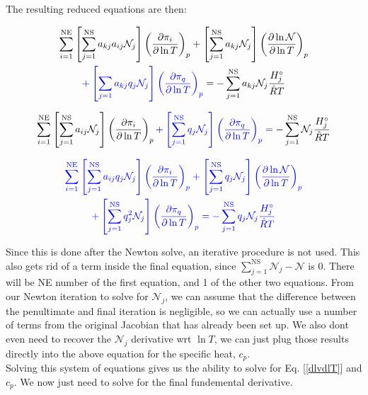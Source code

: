 \documentclass[10pt]{article}
\begin{document}
\begin{flushleft}
The resulting reduced equations are then:

\begin{multline}
    \sum_{i=1}^\text{NE} \left[ \sum_{j=1}^\text{NS} a_{kj} a_{ij} \mathcal{N}_j \right] \left( \frac{\partial \pi_i}{\partial \ln T} \right)_p + \left[\sum_{j=1}^\text{NS} a_{kj} \mathcal{N}_j \right] \left( \frac{\partial \ln \mathcal{N}}{\partial \ln T} \right)_p \\ \textcolor{blue}{+ \left[ \sum_{j=1} a_{kj} q_j \mathcal{N}_j \right] \left( \frac{\partial \pi_q}{\partial \ln T} \right)_p} = -\sum_{j=1}^\text{NS} a_{kj} \mathcal{N}_j \frac{H_j^\circ}{\hat{R}T}
\end{multline}

\begin{multline}
\sum_{i=1}^\text{NE} \left[ \sum_{j=1}^\text{NS} a_{ij} \mathcal{N}_j \right] \left( \frac{\partial \pi_i}{\partial \ln T} \right)_p \textcolor{blue}{+ \left[ \sum_{j=1}^\text{NS} q_j \mathcal{N}_j \right] \left( \frac{\partial \pi_q}{\partial \ln T} \right)_p} = -\sum_{j=1}^\text{NS} \mathcal{N}_j \frac{H_j^\circ}{\hat{R}T}
\end{multline}

\begin{multline}
    \textcolor{blue}{\sum_{i=1}^\text{NE} \left[ \sum_{j=1}^\text{NS} a_{ij} q_j \mathcal{N}_j \right] \left( \frac{\partial \pi_i}{\partial \ln T} \right)_p + \left[ \sum_{j=1}^\text{NS} q_j \mathcal{N}_j \right] \left( \frac{\partial \ln \mathcal{N}}{\partial \ln T} \right)_p} \\ \textcolor{blue}{+ \left[ \sum_{j=1}^\text{NS} q_j^2 \mathcal{N}_j \right] \left( \frac{\partial \pi_q}{\partial \ln T} \right)_p = - \sum_{j=1}^\text{NS} q_j \mathcal{N}_j \frac{H_j^\circ}{\hat{R}T}}
\end{multline}


Since this is done after the Newton solve, an iterative procedure is not used. This also gets rid of a term inside the final equation, since $\sum_{j=1}^\text{NS} \mathcal{N}_j - \mathcal{N} $ is 0. There will be NE number of the first equation, and 1 of the other two equations. From our Newton iteration to solve for $\mathcal{N}_j$, we can assume that the difference between the penultimate and final iteration is negligible, so we can actually use a number of terms from the original Jacobian that has already been set up. We also dont even need to recover the $\mathcal{N}_j$ derivative wrt $\ln T$, we can just plug those results directly into the above equation for the specific heat, $c_p$. 
\vspace{5mm} 
\\ Solving this system of equations gives us the ability to solve for Eq.  [\ref{dlvdlT}] and $c_p$.  We now just need to solve for the final fundemental derivative.



\end{flushleft}
\end{document}
